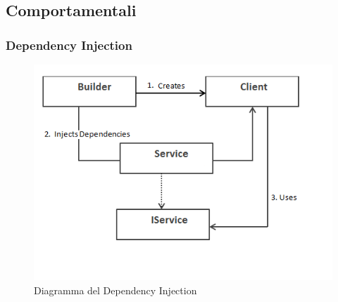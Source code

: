 	\subsection{ Comportamentali}
	
		\subsubsection{Dependency Injection}
		\begin{figure}[H]
		\centering
		\includegraphics[width=0.5\linewidth]{GraficiAppendici/dependency.png}
		\caption{Diagramma del  Dependency Injection}
	\end{figure}
